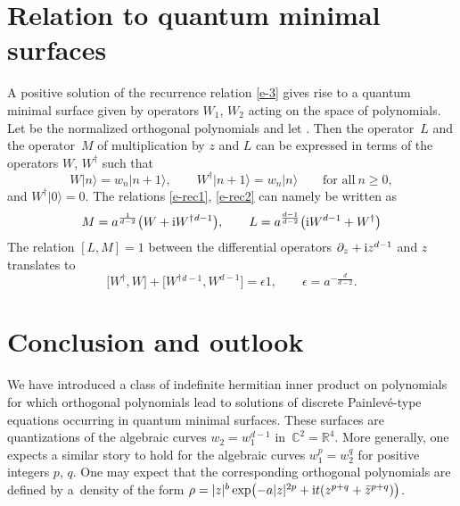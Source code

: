 \documentclass[10pt,a4paper]{amsart}
\numberwithin{equation}{section}
\theoremstyle{definition}
\begin{document}
\section{Relation to quantum minimal surfaces}\label{s-5}
A positive solution of the recurrence relation \eqref{e-3} gives rise to a quantum minimal surface given by operators $W_1$, $W_2$ acting on the space of polynomials. Let
be the normalized orthogonal polynomials and let . Then the
operator~$L$ and the operator~$M$ of multiplication by $z$ and $L$ can be expressed in terms of the operators $W$, $W^\dagger$ such that
\[
W|n\rangle=w_n|n+1\rangle,\qquad W^{\dagger}|n+1\rangle=w_n|n\rangle \qquad \text{for all}\ n\geq0,
\]
and $W^\dagger|0\rangle=0$.
The relations \eqref{e-rec1}, \eqref{e-rec2} can namely be written as
\begin{align*}
 M = a^{{\frac1{d-2}}}\bigl(W+{\rm i}W^\dagger{}^{d-1}\bigr),
\qquad
 L = a^{{\frac{d-1}{d-2}}}\bigl({\rm i}W^{d-1}+W^\dagger\bigr)
\end{align*}
The relation $[L,M]=1$ between the differential operators $\partial_z+{\rm i}z^{d-1}$ and $z$ translates to
\[
\big[W^\dagger,W\big]+\big[W^\dagger{}^{d-1},W^{d-1}\big]=\epsilon 1, \qquad \epsilon=a^{-\frac{d}{d-2}}.
\]

\section{Conclusion and outlook}\label{s-6}
We have introduced a class of indefinite hermitian inner product on polynomials for which orthogonal polynomials lead to solutions of discrete Painlev\'e-type equations occurring in quantum minimal surfaces. These surfaces are quantizations of the algebraic curves $w_2=w_1^{d-1}$ in~${\mathbb C^2=\mathbb R^4}$. More generally, one expects a similar story to hold for the algebraic curves $w_1^p=w_2^q$ for positive integers $p$, $q$. One may expect that the corresponding orthogonal polynomials are defined by a~density of the form $\rho=|z|^b\exp\bigl(-a|z|^{2p}+{\rm i}t(z^{p+q}+\bar z^{p+q})\bigr)$.
\end{document}
